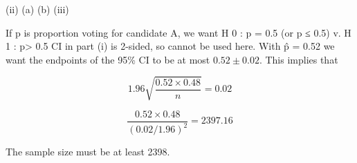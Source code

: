\documentclass[a4paper,12pt]{article}
\begin{document}
\newpage


(ii)
(a)
(b)
(iii)

If p is proportion voting for candidate A, we want
H 0 : p = 0.5 (or p ≤ 0.5) v. H 1 : p> 0.5 
CI in part (i) is 2-sided, so cannot be used here. 
With p̂ = 0.52 we want the endpoints of the 95\% CI to be at most $0.52 \pm 0.02$.
This implies that


\[  1.96 \sqrt{ \frac{ 0.52 \times 0.48 }{n} }  = 0.02 \]

\[  \frac{0.52 \times 0.48 }{(0.02 / 1.96)^2
}  = 2397.16  \]

The sample size must be at least 2398.

\end{document}
